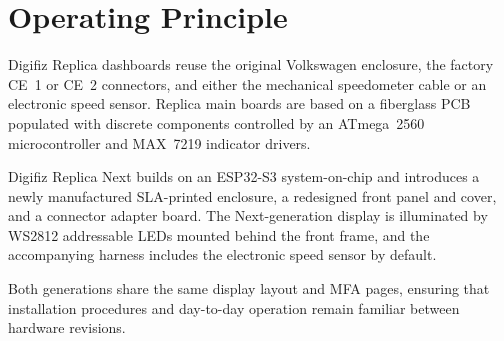 \chapter{Operating Principle} \label{ch:operating-principle}

Digifiz Replica dashboards reuse the original Volkswagen enclosure, the factory CE~1 or CE~2 connectors, and either the mechanical speedometer cable or an electronic speed sensor.
Replica main boards are based on a fiberglass PCB populated with discrete components controlled by an ATmega~2560 microcontroller and MAX~7219 indicator drivers.

Digifiz Replica Next builds on an ESP32-S3 system-on-chip and introduces a newly manufactured SLA-printed enclosure, a redesigned front panel and cover, and a connector adapter board.
The Next-generation display is illuminated by WS2812 addressable LEDs mounted behind the front frame, and the accompanying harness includes the electronic speed sensor by default.

Both generations share the same display layout and MFA pages, ensuring that installation procedures and day-to-day operation remain familiar between hardware revisions.
